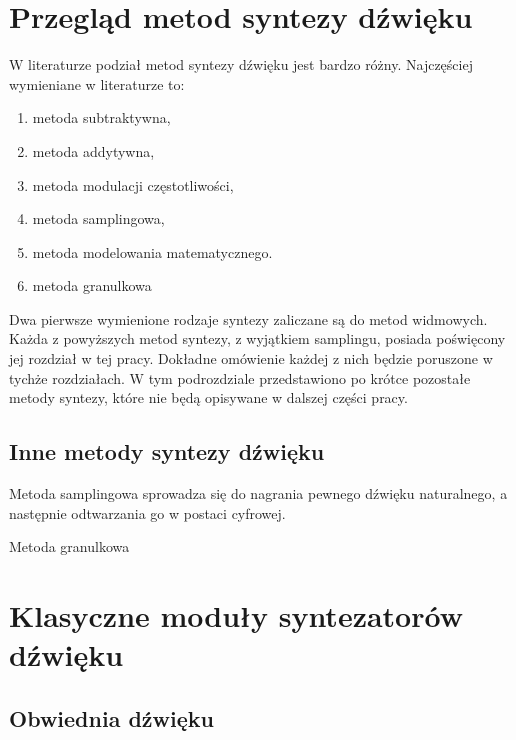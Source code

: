 \section{Przegląd metod syntezy dźwięku}
W literaturze podział metod syntezy dźwięku jest bardzo różny. Najczęściej wymieniane w literaturze to:
\begin{enumerate}
	\item metoda subtraktywna,
	
	\item metoda addytywna,
	
	\item metoda modulacji częstotliwości,
	
	\item metoda samplingowa,
	
	\item metoda modelowania matematycznego.
	
	\item metoda granulkowa
\end{enumerate}
Dwa pierwsze wymienione rodzaje syntezy zaliczane są do metod widmowych. 
Każda z powyższych metod syntezy, z wyjątkiem samplingu, posiada poświęcony jej rozdział w tej pracy. Dokładne omówienie każdej z nich będzie poruszone w tychże rozdziałach. W tym podrozdziale przedstawiono po krótce pozostałe metody syntezy, które nie będą opisywane w dalszej części pracy.

\subsection{Inne metody syntezy dźwięku}
Metoda samplingowa sprowadza się do nagrania pewnego dźwięku naturalnego, a następnie odtwarzania go w postaci cyfrowej.

Metoda granulkowa 


\section{Klasyczne moduły syntezatorów dźwięku}
\subsection{Obwiednia dźwięku}

